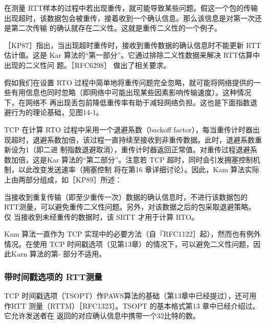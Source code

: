 在测量 RTT样本的过程中若出现重传，就可能导致某些问题。假这一个包的传输出现超时，该数据包会被重传，接着收到一个确认信息。那么该信息是对第一次还是第二次传输
的确认就存在二义性。这就是重传二义性的一个例子。

［KP87］指出，当出现超时重传时，接收到重传数据的确认信息时不能更新 RTT 估计值。这是 Kar 算法的“第一部分”。它通过排除二义性数据来解决 RTT估算中出现的二义性问
题。［RFC6298］ 做出了相关要求。

假如我们在设置 RTO 过程中简单地将重传问题完全忽略，就可能将网络提供的一些有用信息也同时忽略（即网络中可能出现某些因素影响传输速度）。这种情况下，在网络不
再出现丢包前降低重传率有助于减轻网络负担。这也是下面指数退避行为的理论基础，见图14-1。

TCP 在计算 RTO 过程中采用一个退避系数（backoff factor），每当重传计时器出现超时，退避系数加倍，该过程一直持续至接收到非重传数据。此时，退避系数重新设为1（即二进
制指数退避取消），重传计时器返回正常值。对重传过程退避系数加倍，这是Kar 算法的“第二部分”。注意若 TCP 超时，同时会引发拥塞控制机制，以此改变发送速率（拥塞控制
将在第16 章详细讨论）。因此，Kam 算法实际上由两部分组成，如［KP89］所述：

当接收到重复传输（即至少重传一次）数据的确认信息时，不进行该数据包的RTT测量，可以避免重传二义性问题。另外，对该数据之后的包采取退避策略。仅
当接收到未经重传的数据时，该 SRTT 才用于计算 RTO。

Kam 算法一直作为 TCP 实现中的必要方法（自『RFC1122］起），然而也有例外情况。在使用 TCP 时间戳选项（见第13章）的情况下，可以避免二义性问题，因此Karn 算法的第-
部分不适用。

\subsubsection{带时间戳选项的 RTT测量}

TCP 时间戳选项（TSOPT）作PAWS算法的基础（第13章中已经提过），还可用作RTT 测量（RTTM）［RFC1323］。TSOPT 的基本格式第13 章中已经介绍过。它允许发送者在
返回的对应确认信息中携带一个32比特的数。

